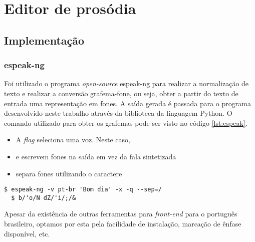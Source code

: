 
\simb[ms (milissegundos)]
\simb[Hz (Hertz)]
\chapter{Editor de prosódia}

\section{Implementação}

\subsection{espeak-ng}
Foi utilizado o programa \emph{open-source} espeak-ng \cite{espeakng} para
realizar a normalização de texto e realizar a conversão grafema-fone, ou seja,
obter a partir do texto de entrada uma representação em fones. A saída gerada
é passada para o programa desenvolvido neste trabalho através da biblioteca
 da linguagem Python. O comando utilizado para obter os grafemas pode ser visto no código \ref{lst:espeak}.

\begin{itemize}
\item A \emph{flag}  seleciona uma voz. Neste caso, 
\item {} e  escrevem fones na saída em vez da fala sintetizada
\item {} separa fones utilizando o caractere \code{/}
\end{itemize}

\begin{lstlisting}[caption=Utilização do programa espeak e saída correspondente,
  label=lst:espeak]
  $ espeak-ng -v pt-br 'Bom dia' -x -q --sep=/
  $ b/'o/N dZ/'i/;/&
\end{lstlisting}

Apesar da existência de outras ferramentas para \emph{front-end} para o português brasileiro, optamos por esta pela facilidade de instalação, marcação de ênfase disponível, etc.

